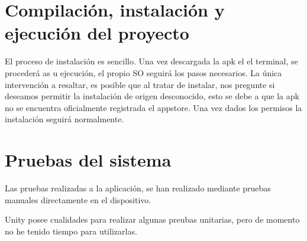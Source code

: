 \section{Compilación, instalación y ejecución del proyecto}

El proceso de instalación es sencillo. Una vez descargada la apk el el terminal, se procederá as u ejecución, el propio SO seguirá los pasos necesarios. La única intervención a resaltar, es posible que al tratar de instalar, nos pregunte si deseamos permitir la instalación de origen desconocido, esto se debe a que la apk no se encuentra oficialmente registrada el appstore. Una vez dados los permisos la instalación seguirá normalmente.

\section{Pruebas del sistema}
Las pruebas realizadas a la aplicación, se han realizado mediante pruebas manuales directamente en el dispositivo.

Unity posee cualidades para realizar algunas preubas unitarias, pero de momento no he tenido tiempo para utilizarlas. 